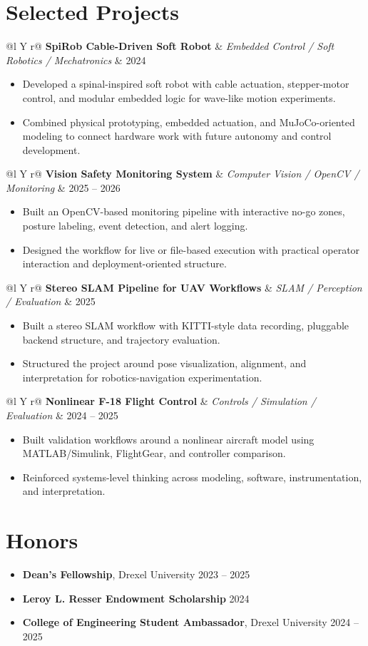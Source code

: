 \documentclass[10pt,letterpaper]{article}
\makeatletter
\newenvironment{project}[3]
{
\begin{tabularx}{\textwidth}{@{}l Y r@{}}
\textbf{#1} & \textit{#2} & #3
\end{tabularx}
\vspace{-0.45em}
\begin{itemize}[leftmargin=1.15em, itemsep=0.14em, topsep=0.15em]
}
{
\end{itemize}
\vspace{0.05em}
}
\makeatother
\begin{document}
\section{Selected Projects}

\begin{project}
{SpiRob Cable-Driven Soft Robot}
{Embedded Control / Soft Robotics / Mechatronics}
{2024}
    \item Developed a spinal-inspired soft robot with cable actuation, stepper-motor control, and modular embedded logic for wave-like motion experiments.
    \item Combined physical prototyping, embedded actuation, and MuJoCo-oriented modeling to connect hardware work with future autonomy and control development.
\end{project}

\begin{project}
{Vision Safety Monitoring System}
{Computer Vision / OpenCV / Monitoring}
{2025 -- 2026}
    \item Built an OpenCV-based monitoring pipeline with interactive no-go zones, posture labeling, event detection, and alert logging.
    \item Designed the workflow for live or file-based execution with practical operator interaction and deployment-oriented structure.
\end{project}

\begin{project}
{Stereo SLAM Pipeline for UAV Workflows}
{SLAM / Perception / Evaluation}
{2025}
    \item Built a stereo SLAM workflow with KITTI-style data recording, pluggable backend structure, and trajectory evaluation.
    \item Structured the project around pose visualization, alignment, and interpretation for robotics-navigation experimentation.
\end{project}

\begin{project}
{Nonlinear F-18 Flight Control}
{Controls / Simulation / Evaluation}
{2024 -- 2025}
    \item Built validation workflows around a nonlinear aircraft model using MATLAB/Simulink, FlightGear, and controller comparison.
    \item Reinforced systems-level thinking across modeling, software, instrumentation, and interpretation.
\end{project}

\section{Honors}

\begin{itemize}[leftmargin=1.15em, itemsep=0.14em, topsep=0.15em]
    \item \textbf{Dean's Fellowship}, Drexel University \hfill 2023 -- 2025
    \item \textbf{Leroy L. Resser Endowment Scholarship} \hfill 2024
    \item \textbf{College of Engineering Student Ambassador}, Drexel University \hfill 2024 -- 2025
\end{itemize}
\end{document}

